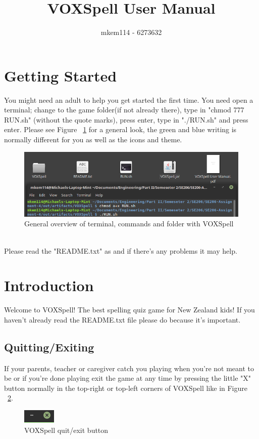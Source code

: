 \documentclass[12pt,a4paper,titlepage,onecolumn]{article}
\author{mkem114 - 6273632}
\title{VOXSpell User Manual}
\begin{document}
	\maketitle
	\tableofcontents
	\listoffigures
	
	\section{Getting Started}
	You might need an adult to help you get started the first time. You need open a terminal; change to the game folder(if not already there), type in "chmod 777 RUN.sh" (without the quote marks), press enter, type in "./RUN.sh" and press enter. Please see Figure ~\ref{fig:TerminalandFolder} for a general look, the green and blue writing is normally different for you as well as the icons and theme.
	\begin{figure}[h]
	\centering
	\includegraphics[width=1\linewidth]{"Figures/Getting Started/TerminalandFolder"}
	\caption[Terminal commands]{General overview of terminal, commands and folder with VOXSpell}
	\label{fig:TerminalandFolder}
	\end{figure}\\
	Please read the "README.txt" as and if there's any problems it may help.
	
	\section{Introduction}
	Welcome to VOXSpell! The best spelling quiz game for New Zealand kids! If you haven't already read the README.txt file please do because it's important.\\
		\subsection{Quitting/Exiting}
		If your parents, teacher or caregiver catch you playing when you're not meant to be or if you're done playing exit the game at any time by pressing the little "X" button normally in the top-right or top-left corners of VOXSpell like in Figure ~\ref{fig:Exit}.
		\begin{figure}[h]
		\centering
		\includegraphics[width=0.1\linewidth]{Figures/Introduction/Exit}
		\caption[Quit/Exit]{VOXSpell quit/exit button}
		\label{fig:Exit}
		\end{figure}
\end{document}
